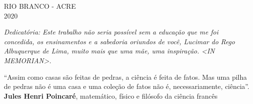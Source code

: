 \documentclass[
	12pt,				%
	openright,			%
	twoside,			%
	a4paper,			%
	english,			%
	french,				%
	spanish,			%
	brazil				%
	]{abntex2}
\begin{document}
\begin{center}
	\vspace{4mm}
	RIO BRANCO - ACRE \\
	2020
	
\end{center}
\clearpage
\begin{dedicatoria}
   \vspace*{\fill}
   \centering
   \noindent
   \textit{ Dedicat\'oria: Este trabalho não seria possível sem a educação que me foi concedida, os ensinamentos e a sabedoria oriundos de você, Lucimar do Rego Albuquerque de Lima, muito mais que uma mãe, uma inspiração. <IN MEMORIAN>.} \vspace*{\fill}
\end{dedicatoria}

\begin{agradecimentos}
\lipsum[3]
\end{agradecimentos}

\begin{epigrafe}
    \vspace*{\fill}
	\begin{flushright}
		``Assim como casas são feitas de pedras, a ciência é feita de fatos. Mas uma pilha de pedras não é uma casa e uma coleção de fatos não é, necessariamente, ciência''.  \\ \textbf{Jules Henri Poincaré}, matemático, físico e filósofo da ciência francês
	\end{flushright}
\end{epigrafe}

\end{document}
